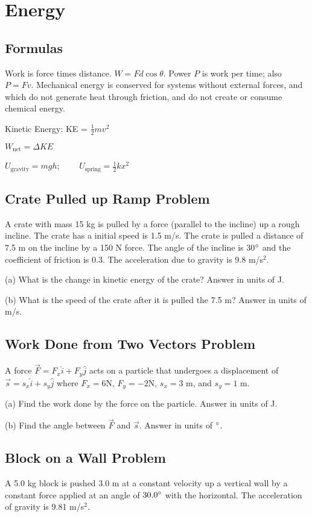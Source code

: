 \documentclass[../physics12.tex]{subfiles}
\begin{document}
\chapter{Energy}
\section{Formulas}
Work is force times distance. $W=Fd\cos\theta$. Power $P$ is work per time; also $P=Fv$. Mechanical energy is conserved for systems without external forces, and which 
do not generate heat through friction, and do not create or consume chemical energy.

Kinetic Energy: KE = $\frac{1}{2}mv^2$

$W_{\text{net}} = \Delta KE$

$U_{\text{gravity}} = mgh$; $\qquad U_{\text{spring}} = \frac{1}{2}kx^2$

\section{Crate Pulled up Ramp Problem}
A crate with mass 15 kg is pulled by a force (parallel to the incline) up a rough incline. The crate has a initial speed is 1.5 m/s.
The crate is pulled a distance of 7.5 m on the incline by a 150 N force. The angle of the incline is 30$\degree$ and the coefficient of friction is 0.3.
The acceleration due to gravity is 9.8 m/s$^2$.

(a) What is the change in kinetic energy of the crate?
Answer in units of J.

(b) What is the speed of the crate after it is pulled the 7.5 m?
Answer in units of m/s.

\section{Work Done from Two Vectors Problem}
A force $\vec{F}=F_x\hat{i}+F_y\hat{j}$ acts on a particle that undergoes a displacement of 
$\vec{s}=s_x\hat{i}+s_y\hat{j}$ where $F_x = 6$N, $F_y=-2$N, $s_x=3$ m, and $s_y=1$ m.

(a) Find the work done by the force on the particle.
Answer in units of J.

(b) Find the angle between $\vec{F}$ and $\vec{s}$.
Answer in units of $\degree$.

\section{Block on a Wall Problem}
A 5.0 kg block is pushed 3.0 m at a constant velocity up a vertical wall by a constant force applied at an angle of $30.0\degree$ with the horizontal.
The acceleration of gravity is 9.81 m/s$^2$.
\end{document}
